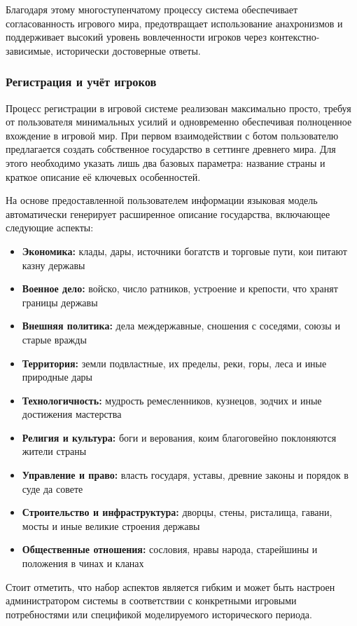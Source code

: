 Благодаря этому многоступенчатому процессу система обеспечивает согласованность игрового мира, предотвращает использование анахронизмов и поддерживает высокий уровень вовлеченности игроков через контекстно-зависимые, исторически достоверные ответы.

\subsubsection{Регистрация и учёт игроков}

Процесс регистрации в игровой системе реализован максимально просто, требуя от пользователя минимальных усилий и одновременно обеспечивая полноценное вхождение в игровой мир. При первом взаимодействии с ботом пользователю предлагается создать собственное государство в сеттинге древнего мира. Для этого необходимо указать лишь два базовых параметра: название страны и краткое описание её ключевых особенностей.

На основе предоставленной пользователем информации языковая модель автоматически генерирует расширенное описание государства, включающее следующие аспекты:
\begin{itemize}
\item \textbf{Экономика:} клады, дары, источники богатств и торговые пути, кои питают казну державы
\item \textbf{Военное дело:} войско, число ратников, устроение и крепости, что хранят границы державы
\item \textbf{Внешняя политика:} дела междержавные, сношения с соседями, союзы и старые вражды
\item \textbf{Территория:} земли подвластные, их пределы, реки, горы, леса и иные природные дары
\item \textbf{Технологичность:} мудрость ремесленников, кузнецов, зодчих и иные достижения мастерства
\item \textbf{Религия и культура:} боги и верования, коим благоговейно поклоняются жители страны
\item \textbf{Управление и право:} власть государя, уставы, древние законы и порядок в суде да совете
\item \textbf{Строительство и инфраструктура:} дворцы, стены, ристалища, гавани, мосты и иные великие строения державы
\item \textbf{Общественные отношения:} сословия, нравы народа, старейшины и положения в чинах и кланах
\end{itemize}

Стоит отметить, что набор аспектов является гибким и может быть настроен администратором системы в соответствии с конкретными игровыми потребностями или спецификой моделируемого исторического периода.


